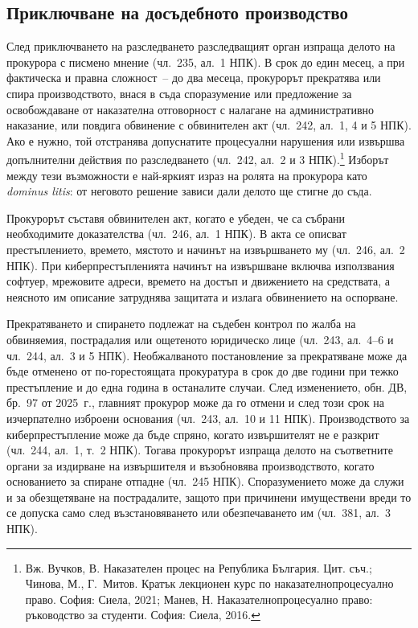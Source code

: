\subsection{Приключване на досъдебното производство}
\label{sec:priklyuchvane}

След приключването на разследването разследващият орган изпраща делото на прокурора с
писмено мнение (чл.~235, ал.~1 НПК). В срок до един месец, а при фактическа и правна
сложност~-- до два месеца, прокурорът прекратява или спира производството, внася в съда
споразумение или предложение за освобождаване от наказателна отговорност с налагане на
административно наказание, или повдига обвинение с обвинителен акт (чл.~242, ал.~1, 4 и
5 НПК). Ако е нужно, той отстранява допуснатите процесуални нарушения или извършва
допълнителни действия по разследването (чл.~242, ал.~2 и 3 НПК).\footnote{Вж. Вучков, В.
Наказателен процес на Република България. Цит. съч.; Чинова, М., Г.~Митов. Кратък
лекционен курс по наказателнопроцесуално право. София: Сиела, 2021; Манев, Н.
Наказателнопроцесуално право: ръководство за студенти. София: Сиела, 2016.} Изборът между
тези възможности е най-яркият израз на ролята на прокурора като \textit{dominus litis}: от
неговото решение зависи дали делото ще стигне до съда.

Прокурорът съставя обвинителен акт, когато е убеден, че са събрани необходимите
доказателства (чл.~246, ал.~1 НПК). В акта се описват престъплението, времето, мястото и
начинът на извършването му (чл.~246, ал.~2 НПК). При киберпрестъпленията начинът на
извършване включва използвания софтуер, мрежовите адреси, времето на достъп и движението
на средствата, а неясното им описание затруднява защитата и излага обвинението на
оспорване.

Прекратяването и спирането подлежат на съдебен контрол по жалба на обвиняемия,
пострадалия или ощетеното юридическо лице (чл.~243, ал.~4--6 и чл.~244, ал.~3 и 5 НПК).
Необжалваното постановление за прекратяване може да бъде отменено от по-горестоящата
прокуратура в срок до две години при тежко престъпление и до една година в останалите
случаи. След изменението, обн. ДВ, бр.~97 от 2025~г., главният прокурор може да го отмени
и след този срок на изчерпателно изброени основания (чл.~243, ал.~10 и 11 НПК).
Производството за киберпрестъпление може да бъде спряно, когато извършителят не е разкрит
(чл.~244, ал.~1, т.~2 НПК). Тогава прокурорът изпраща делото на съответните органи за
издирване на извършителя и възобновява производството, когато основанието за спиране
отпадне (чл.~245 НПК). Споразумението може да служи и за обезщетяване на пострадалите,
защото при причинени имуществени вреди то се допуска само след възстановяването или
обезпечаването им (чл.~381, ал.~3 НПК).

